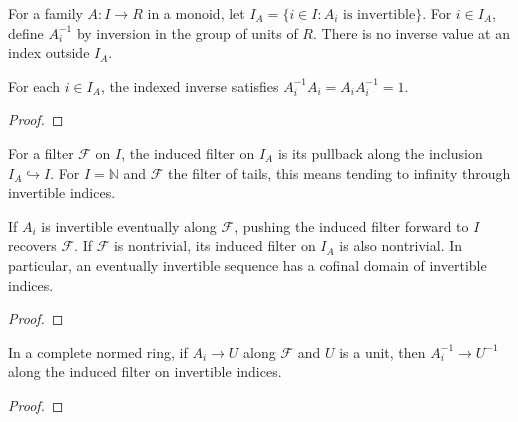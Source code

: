 \begin{supporting}
\begin{definition}
\label{def:invertible-index}
\leanok
For a family $A:I\to R$ in a monoid, let $I_A=\{i\in I:A_i\text{ is invertible}\}$. For $i\in I_A$, define $A_i^{-1}$ by inversion in the group of units of $R$. There is no inverse value at an index outside $I_A$.
\end{definition}

\begin{theorem}
\label{thm:invertible-index}
\leanok
For each $i\in I_A$, the indexed inverse satisfies $A_i^{-1}A_i=A_iA_i^{-1}=1$.
\end{theorem}
\begin{proof}
\leanok
\end{proof}

\begin{definition}
\label{def:invertible-index-filter}
\leanok
For a filter $\mathcal F$ on $I$, the induced filter on $I_A$ is its pullback along the inclusion $I_A\hookrightarrow I$. For $I=\mathbb N$ and $\mathcal F$ the filter of tails, this means tending to infinity through invertible indices.
\end{definition}

\begin{theorem}
\label{thm:invertible-index-filter}
\leanok
If $A_i$ is invertible eventually along $\mathcal F$, pushing the induced filter forward to $I$ recovers $\mathcal F$. If $\mathcal F$ is nontrivial, its induced filter on $I_A$ is also nontrivial. In particular, an eventually invertible sequence has a cofinal domain of invertible indices.
\end{theorem}
\begin{proof}
\leanok
\end{proof}

\begin{theorem}
\label{thm:invertible-index-continuity}
\leanok
In a complete normed ring, if $A_i\to U$ along $\mathcal F$ and $U$ is a unit, then $A_i^{-1}\to U^{-1}$ along the induced filter on invertible indices.
\end{theorem}
\begin{proof}
\leanok
\end{proof}
\end{supporting}


